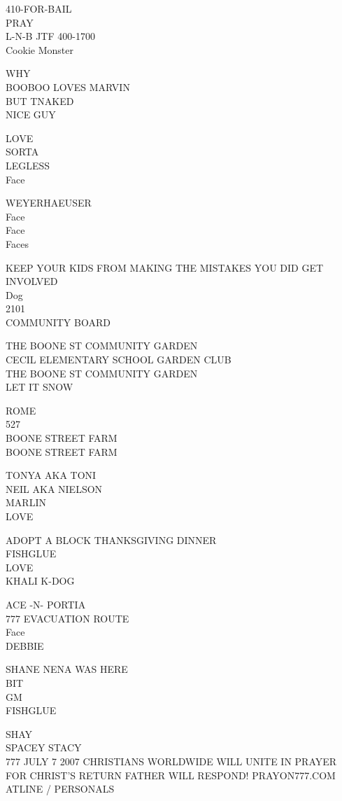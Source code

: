 \documentclass[10pt,letterpaper]{article}
\begin{document}
410{-}FOR{-}BAIL\\
PRAY\\
L{-}N{-}B JTF 400{-}1700\\
Cookie Monster

WHY\\
BOOBOO LOVES MARVIN\\
BUT TNAKED\\
NICE GUY

LOVE\\
SORTA\\
LEGLESS\\
Face

WEYERHAEUSER\\
Face\\
Face\\
Faces

KEEP YOUR KIDS FROM MAKING THE MISTAKES YOU DID GET INVOLVED\\
Dog\\
2101\\
COMMUNITY BOARD

THE BOONE ST COMMUNITY GARDEN\\
CECIL ELEMENTARY SCHOOL GARDEN CLUB\\
THE BOONE ST COMMUNITY GARDEN\\
LET IT SNOW

ROME\\
527\\
BOONE STREET FARM\\
BOONE STREET FARM

TONYA AKA TONI\\
NEIL AKA NIELSON\\
MARLIN\\
LOVE

ADOPT A BLOCK THANKSGIVING DINNER\\
FISHGLUE\\
LOVE\\
KHALI K{-}DOG

ACE {-}N{-} PORTIA\\
777 EVACUATION ROUTE\\
Face\\
DEBBIE

SHANE NENA WAS HERE\\
BIT\\
GM\\
FISHGLUE

SHAY\\
SPACEY STACY\\
777 JULY 7 2007 CHRISTIANS WORLDWIDE WILL UNITE IN PRAYER FOR CHRIST'S RETURN FATHER WILL RESPOND! PRAYON777.COM\\
ATLINE / PERSONALS
\end{document}
